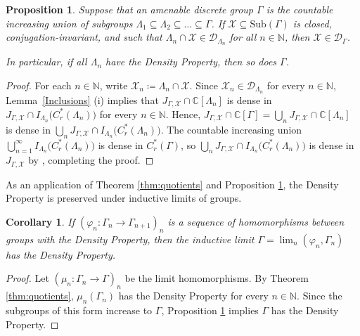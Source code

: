 \documentclass[11pt, oneside, reqno]{amsart}
\newtheorem{cor}[thm]{Corollary}
\newtheorem{prp}[thm]{Proposition}
\theoremstyle{definition}
\theoremstyle{remark}
\numberwithin{equation}{section}
\begin{document}
\begin{prp}
\label{prp:induc}
    Suppose that an amenable discrete group $\Gamma$ is the countable increasing union of subgroups $\Lambda_1 \subseteq \Lambda_2 \subseteq \dots \subseteq \Gamma$. If $\mathcal{X} \subseteq \mathrm{Sub}(\Gamma)$ is closed, conjugation-invariant, and such that $\Lambda_n\cap\mathcal{X}\in\mathcal{D}_{\Lambda_n}$ for all $n\in\mathbb{N}$, then $\mathcal{X}\in\mathcal{D}_{\Gamma}$.

    In particular, if all $\Lambda_n$ have the Density Property, then so does $\Gamma$.
\end{prp}
\begin{proof}
    For each $n\in\mathbb{N}$, write $\mathcal{X}_{n} \coloneq \Lambda_n\cap\mathcal{X}$. Since $\mathcal{X}_n \in \mathcal{D}_{\Lambda_{n}}$ for every $n \in \mathbb{N}$, Lemma~\ref{Inclusions} (i) implies that $J_{\Gamma,\mathcal{X}}\cap\mathbb{C}[\Lambda_n]$ is dense in $J_{\Gamma,\mathcal{X}}\cap I_{\Lambda_n} \big(C^{*}_{r}(\Lambda_n) \big)$ for every $n \in \mathbb{N}$. Hence, $J_{\Gamma,\mathcal{X}}\cap\mathbb{C}[\Gamma] = \bigcup_{n}J_{\Gamma,\mathcal{X}}\cap\mathbb{C}[\Lambda_n]$ is dense in $\bigcup_{n}J_{\Gamma,\mathcal{X}}\cap I_{\Lambda_n} \big(C^{*}_{r}(\Lambda_n)\big)$.
    The countable increasing union $\bigcup_{n=1}^\infty I_{\Lambda_n}\big(C^{*}_{r}(\Lambda_n) \big)$ is dense in $C^{*}_{r}(\Gamma)$, so $\bigcup_{n}J_{\Gamma,\mathcal{X}}\cap I_{\Lambda_n} \big(C^{*}_{r}(\Lambda_n) \big)$ is dense in $J_{\Gamma,\mathcal{X}}$ by \cite[Lemma~III.4.1]{Davidson}, completing the proof.
\end{proof}

As an application of Theorem \ref{thm:quotients} and Proposition \ref{prp:induc}, the Density Property is preserved under inductive limits of groups.

\begin{cor}
    If $(\varphi_{n}:\Gamma_{n}\to \Gamma_{n+1})_{n}$ is a sequence of homomorphisms between groups with the Density Property, then the inductive limit $\Gamma = \lim_{n}(\varphi_{n}, \Gamma_{n})$ has the Density Property.
\end{cor}
\begin{proof}
    Let $(\mu_{n}:\Gamma_{n}\to \Gamma)_{n}$ be the limit homomorphisms. By Theorem \ref{thm:quotients}, $\mu_{n}(\Gamma_{n})$ has the Density Property for every $n\in\mathbb{N}$. Since the subgroups of this form increase to $\Gamma$, Proposition \ref{prp:induc} implies $\Gamma$ has the Density Property.
\end{proof}
\end{document}
